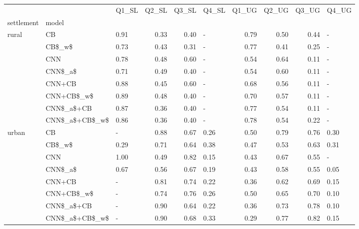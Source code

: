 \begin{tabular}{lllrrlrrrl}
\toprule
      &                & Q1\_SL &  Q2\_SL &  Q3\_SL & Q4\_SL &  Q1\_UG &  Q2\_UG &  Q3\_UG & Q4\_UG \\
settlement & model &       &        &        &       &        &        &        &       \\
\midrule
rural & CB &  0.91 &   0.33 &   0.40 &     - &   0.79 &   0.50 &   0.44 &     - \\
      & CB\$\_w\$ &  0.73 &   0.43 &   0.31 &     - &   0.77 &   0.41 &   0.25 &     - \\
      & CNN &  0.78 &   0.48 &   0.60 &     - &   0.54 &   0.64 &   0.11 &     - \\
      & CNN\$\_a\$ &  0.71 &   0.49 &   0.40 &     - &   0.54 &   0.60 &   0.11 &     - \\
      & CNN+CB &  0.88 &   0.45 &   0.60 &     - &   0.68 &   0.56 &   0.11 &     - \\
      & CNN+CB\$\_w\$ &  0.89 &   0.48 &   0.40 &     - &   0.70 &   0.57 &   0.11 &     - \\
      & CNN\$\_a\$+CB &  0.87 &   0.36 &   0.40 &     - &   0.77 &   0.54 &   0.11 &     - \\
      & CNN\$\_a\$+CB\$\_w\$ &  0.86 &   0.36 &   0.40 &     - &   0.78 &   0.54 &   0.22 &     - \\
urban & CB &     - &   0.88 &   0.67 &  0.26 &   0.50 &   0.79 &   0.76 &  0.30 \\
      & CB\$\_w\$ &  0.29 &   0.71 &   0.64 &  0.38 &   0.47 &   0.53 &   0.63 &  0.31 \\
      & CNN &  1.00 &   0.49 &   0.82 &  0.15 &   0.43 &   0.67 &   0.55 &     - \\
      & CNN\$\_a\$ &  0.67 &   0.56 &   0.67 &  0.19 &   0.43 &   0.58 &   0.55 &  0.05 \\
      & CNN+CB &     - &   0.81 &   0.74 &  0.22 &   0.36 &   0.62 &   0.69 &  0.15 \\
      & CNN+CB\$\_w\$ &     - &   0.74 &   0.76 &  0.26 &   0.50 &   0.65 &   0.70 &  0.10 \\
      & CNN\$\_a\$+CB &     - &   0.90 &   0.64 &  0.22 &   0.36 &   0.73 &   0.78 &  0.10 \\
      & CNN\$\_a\$+CB\$\_w\$ &     - &   0.90 &   0.68 &  0.33 &   0.29 &   0.77 &   0.82 &  0.15 \\
\bottomrule
\end{tabular}
